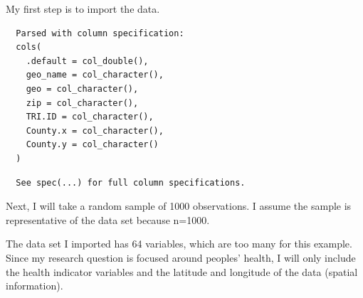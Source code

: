 \documentclass[12pt,twoside]{amherstthesis}
\begin{document}
  My first step is to import the data.
  
  \begin{Shaded}
  \begin{Highlighting}[]
  \StringTok{ }\NormalTok{(}\NormalTok{)}
  \end{Highlighting}
  \end{Shaded}
  
  \begin{verbatim}
  Parsed with column specification:
  cols(
    .default = col_double(),
    geo_name = col_character(),
    geo = col_character(),
    zip = col_character(),
    TRI.ID = col_character(),
    County.x = col_character(),
    County.y = col_character()
  )
  \end{verbatim}
  
  \begin{verbatim}
  See spec(...) for full column specifications.
  \end{verbatim}
  
  Next, I will take a random sample of 1000 observations. I assume the
  sample is representative of the data set because n=1000.
  
  \begin{Shaded}
  \begin{Highlighting}[]
  \NormalTok{(}\NormalTok{)}
  \StringTok{ }\NormalTok{data_subset[}\NormalTok{(}\OperatorTok{:}\NormalTok{,}
     \NormalTok{),]}
  \end{Highlighting}
  \end{Shaded}
  
  The data set I imported has 64 variables, which are too many for this
  example. Since my research question is focused around peoples' health, I
  will only include the health indicator variables and the latitude and
  longitude of the data (spatial information).
  
  \begin{Shaded}
  \begin{Highlighting}[]
  \StringTok{ }\NormalTok{(}\NormalTok{, }\NormalTok{, }\NormalTok{, }\NormalTok{, }\NormalTok{, }\NormalTok{)}
  \StringTok{ }
  \end{Highlighting}
  \end{Shaded}
  
\end{document}
